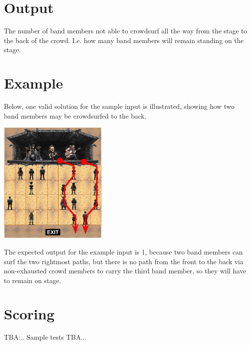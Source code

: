 \section*{Output}

The number of band members not able to crowdsurf all the way from the stage to the back of the crowd. I.e. how many band members will remain standing on the stage.

\section*{Example}

Below, one valid solution for the sample input is illustrated, showing how two band members may be crowdsurfed to the back.

\begin{center}
  \includegraphics[width=0.4\textwidth]{img/example.png}
\end{center}

The expected output for the example input is 1, because two band members can surf the two rightmost paths, but there is no path from the front to the back via non-exhausted crowd members to carry the third band member, so they will have to remain on stage.

\section*{Scoring}

TBA:..
Sample tests TBA...
